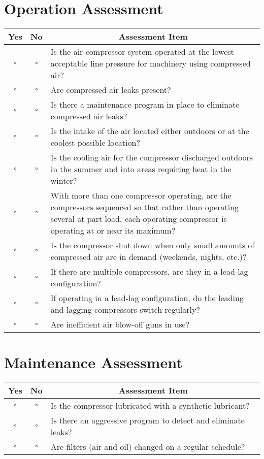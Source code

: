 \documentclass[./main.tex]{subfiles}
\begin{document}
\section*{Operation Assessment}
\begin{tabular}{|c|c|p{14cm}|}
\hline
\multicolumn{1}{|c|}{\textbf{Yes}} & \multicolumn{1}{c|}{\textbf{No}} & \multicolumn{1}{c|}{\textbf{Assessment Item}} \\
\hline
$\square$ & $\square$ & Is the air-compressor system operated at the lowest acceptable line pressure for machinery using compressed air? \\
\hline
$\square$ & $\square$ & Are compressed air leaks present? \\
\hline
$\square$ & $\square$ & Is there a maintenance program in place to eliminate compressed air leaks? \\
\hline
$\square$ & $\square$ & Is the intake of the air located either outdoors or at the coolest possible location? \\
\hline
$\square$ & $\square$ & Is the cooling air for the compressor discharged outdoors in the summer and into areas requiring heat in the winter? \\
\hline
$\square$ & $\square$ & With more than one compressor operating, are the compressors sequenced so that rather than operating several at part load, each operating compressor is operating at or near its maximum? \\
\hline
$\square$ & $\square$ & Is the compressor shut down when only small amounts of compressed air are in demand (weekends, nights, etc.)? \\
\hline
$\square$ & $\square$ & If there are multiple compressors, are they in a lead-lag configuration? \\
\hline
$\square$ & $\square$ & If operating in a lead-lag configuration, do the leading and lagging compressors switch regularly? \\
\hline
$\square$ & $\square$ & Are inefficient air blow-off guns in use?  \\
\hline
\end{tabular}

\section*{Maintenance Assessment}

\begin{tabular}{|c|c|p{14cm}|}
\hline
\multicolumn{1}{|c|}{\textbf{Yes}} & \multicolumn{1}{c|}{\textbf{No}} & \multicolumn{1}{c|}{\textbf{Assessment Item}} \\
\hline
$\square$ & $\square$ & Is the compressor lubricated with a synthetic lubricant? \\
\hline
$\square$ & $\square$ & Is there an aggressive program to detect and eliminate leaks? \\
\hline
$\square$ & $\square$ & Are filters (air and oil) changed on a regular schedule? \\
\hline
\end{tabular}
\end{document}
